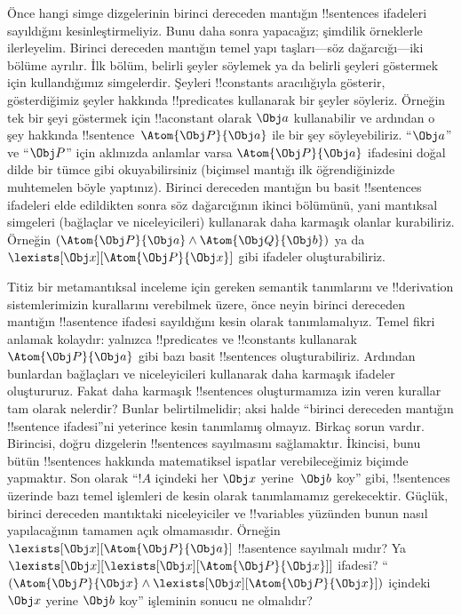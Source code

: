 



Önce hangi simge dizgelerinin birinci dereceden mantığın
!!{sentence}s ifadeleri sayıldığını kesinleştirmeliyiz. Bunu daha sonra
yapacağız; şimdilik örneklerle ilerleyelim. Birinci dereceden mantığın
temel yapı taşları---söz dağarcığı---iki bölüme ayrılır. İlk bölüm,
belirli şeyler söylemek ya da belirli şeyleri göstermek için
kullandığımız simgelerdir. Şeyleri !!{constant}s aracılığıyla gösterir,
gösterdiğimiz şeyler hakkında !!{predicate}s kullanarak bir şeyler
söyleriz. Örneğin tek bir şeyi göstermek için !!a{constant} olarak
$\Obj a$ kullanabilir ve ardından o şey hakkında
!!{sentence}~$\Atom{\Obj P}{\Obj a}$ ile bir şey söyleyebiliriz.
``$\Obj a$'' ve ``$\Obj P$'' için aklınızda anlamlar varsa
$\Atom{\Obj P}{\Obj a}$ ifadesini doğal dilde bir tümce gibi
okuyabilirsiniz (biçimsel mantığı ilk öğrendiğinizde muhtemelen böyle
yaptınız). Birinci dereceden mantığın bu basit !!{sentence}s ifadeleri
elde edildikten sonra söz dağarcığının ikinci bölümünü, yani mantıksal
simgeleri (bağlaçlar ve niceleyicileri) kullanarak daha karmaşık olanlar
kurabiliriz. Örneğin $(\Atom{\Obj P}{\Obj a}\land
\Atom{\Obj Q}{\Obj b})$ ya da
$\lexists[\Obj x][\Atom{\Obj P}{\Obj x}]$ gibi ifadeler oluşturabiliriz.

Titiz bir metamantıksal inceleme için gereken semantik tanımlarını ve
!!{derivation} sistemlerimizin kurallarını verebilmek üzere, önce neyin
birinci dereceden mantığın !!a{sentence} ifadesi sayıldığını kesin
olarak tanımlamalıyız. Temel fikri anlamak kolaydır: yalnızca
!!{predicate}s ve !!{constant}s kullanarak
$\Atom{\Obj P}{\Obj a}$ gibi bazı basit !!{sentence}s oluşturabiliriz.
Ardından bunlardan bağlaçları ve niceleyicileri kullanarak daha karmaşık
ifadeler oluştururuz. Fakat daha karmaşık !!{sentence}s oluşturmamıza
izin veren kurallar tam olarak nelerdir? Bunlar belirtilmelidir; aksi
halde ``birinci dereceden mantığın !!{sentence} ifadesi''ni yeterince
kesin tanımlamış olmayız. Birkaç sorun vardır. Birincisi, doğru
dizgelerin !!{sentence}s sayılmasını sağlamaktır. İkincisi, bunu bütün
!!{sentence}s hakkında matematiksel ispatlar verebileceğimiz biçimde
yapmaktır. Son olarak ``$!A$ içindeki her $\Obj x$ yerine~$\Obj b$
koy'' gibi, !!{sentence}s üzerinde bazı temel işlemleri de kesin
olarak tanımlamamız gerekecektir. Güçlük, birinci dereceden mantıktaki
niceleyiciler ve !!{variable}s yüzünden bunun nasıl yapılacağının
tamamen açık olmamasıdır. Örneğin
$\lexists[\Obj x][\Atom{\Obj P}{\Obj a}]$ !!a{sentence} sayılmalı
mıdır? Ya $\lexists[\Obj x][\lexists[\Obj x][\Atom{\Obj P}{\Obj x}]]$
ifadesi? ``$(\Atom{\Obj P}{\Obj x}\land
\lexists[\Obj x][\Atom{\Obj P}{\Obj x}])$ içindeki $\Obj x$ yerine
$\Obj b$ koy'' işleminin sonucu ne olmalıdır?

